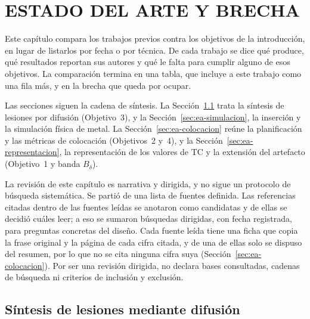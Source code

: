 \chapter{ESTADO DEL ARTE Y BRECHA}\label{cap:estado-arte}

Este capítulo compara los trabajos previos contra los objetivos de la introducción, en lugar de listarlos por fecha o por técnica. De cada trabajo se dice qué produce, qué resultados reportan sus autores y qué le falta para cumplir alguno de esos objetivos. La comparación termina en una tabla, que incluye a este trabajo como una fila más, y en la brecha que queda por ocupar.

Las secciones siguen la cadena de síntesis. La Sección~\ref{sec:ea-lesiones} trata la síntesis de lesiones por difusión (Objetivo~3), y la Sección~\ref{sec:ea-simulacion}, la inserción y la simulación física de metal. La Sección~\ref{sec:ea-colocacion} reúne la planificación y las métricas de colocación (Objetivos~2 y~4), y la Sección~\ref{sec:ea-representacion}, la representación de los valores de TC y la extensión del artefacto (Objetivo~1 y banda $B_{\delta}$).

La revisión de este capítulo es narrativa y dirigida, y no sigue un protocolo de búsqueda sistemática. Se partió de una lista de fuentes definida. Las referencias citadas dentro de las fuentes leídas se anotaron como candidatas y de ellas se decidió cuáles leer; a eso se sumaron búsquedas dirigidas, con fecha registrada, para preguntas concretas del diseño. Cada fuente leída tiene una ficha que copia la frase original y la página de cada cifra citada, y de una de ellas solo se dispuso del resumen, por lo que no se cita ninguna cifra suya (Sección~\ref{sec:ea-colocacion}). Por ser una revisión dirigida, no declara bases consultadas, cadenas de búsqueda ni criterios de inclusión y exclusión.

\section{Síntesis de lesiones mediante difusión}\label{sec:ea-lesiones}

